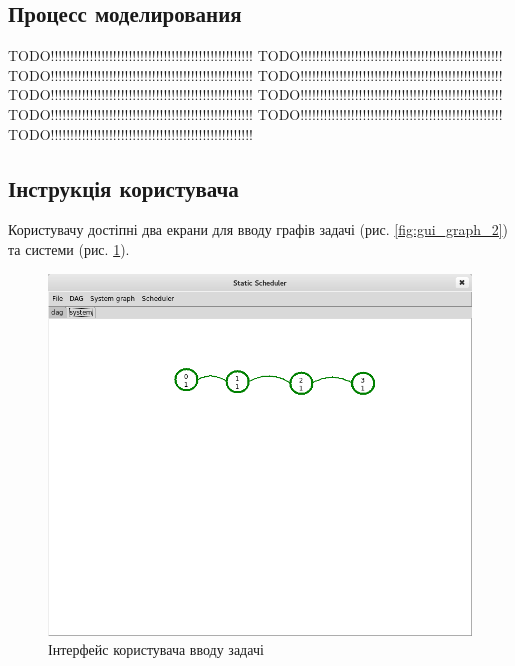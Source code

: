 \subsection{Процесс моделирования}

TODO!!!!!!!!!!!!!!!!!!!!!!!!!!!!!!!!!!!!!!!!!!!!!!!!!!!!
TODO!!!!!!!!!!!!!!!!!!!!!!!!!!!!!!!!!!!!!!!!!!!!!!!!!!!!
TODO!!!!!!!!!!!!!!!!!!!!!!!!!!!!!!!!!!!!!!!!!!!!!!!!!!!!
TODO!!!!!!!!!!!!!!!!!!!!!!!!!!!!!!!!!!!!!!!!!!!!!!!!!!!!
TODO!!!!!!!!!!!!!!!!!!!!!!!!!!!!!!!!!!!!!!!!!!!!!!!!!!!!
TODO!!!!!!!!!!!!!!!!!!!!!!!!!!!!!!!!!!!!!!!!!!!!!!!!!!!!
TODO!!!!!!!!!!!!!!!!!!!!!!!!!!!!!!!!!!!!!!!!!!!!!!!!!!!!
TODO!!!!!!!!!!!!!!!!!!!!!!!!!!!!!!!!!!!!!!!!!!!!!!!!!!!!
TODO!!!!!!!!!!!!!!!!!!!!!!!!!!!!!!!!!!!!!!!!!!!!!!!!!!!!

\subsection{Інструкція користувача}

Користувачу достіпні два екрани для вводу графів задачі (рис. \ref{fig:gui_graph_2}) та системи (рис. \ref{fig:system_graph_2}).

    \begin{figure}[h!]
      \begin{center}
        \includegraphics[width=\textwidth]{res/system_graph_new.png}
      \end{center}
      \caption{Інтерфейс користувача вводу задачі}
    \label{fig:system_graph_2}
    \end{figure}

